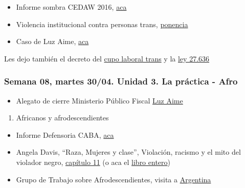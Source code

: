 \documentclass[
]{article}
\providecommand{\tightlist}{%
  \setlength{\itemsep}{0pt}\setlength{\parskip}{0pt}}
\begin{document}
\begin{itemize}
\item
  Informe sombra CEDAW 2016,
  \href{https://drive.google.com/file/d/1Zv0TtTTzgt5N4vSBEo3F7UjiayBQ2BIx/view?usp=sharing}{aca}
\item
  Violencia institucional contra personas trans,
  \href{https://drive.google.com/file/d/1NWDuVTHVpSSWbHTuvP6WPAy6waXvDyXo/view}{ponencia}
\item
  Caso de Luz Aime,
  \href{http://cosecharoja.org/absolvieron-a-luz-aime/}{aca}
\end{itemize}

Les dejo también el decreto del
\href{http://servicios.infoleg.gob.ar/infolegInternet/anexos/340000-344999/341808/norma.htm}{cupo
laboral trans} y la
\href{http://servicios.infoleg.gob.ar/infolegInternet/anexos/350000-354999/351815/norma.htm}{ley
27.636}

\hypertarget{semana-08-martes-3004.-unidad-3.-la-pruxe1ctica---afro}{%
\subsubsection{Semana 08, martes 30/04. Unidad 3. La práctica -
Afro}\label{semana-08-martes-3004.-unidad-3.-la-pruxe1ctica---afro}}

\begin{itemize}
\tightlist
\item
  Alegato de cierre Ministerio Público Fiscal
  \href{https://youtu.be/ZKH82JYVLgc}{Luz Aime}
\end{itemize}

\begin{enumerate}
\def\labelenumi{\alph{enumi}.}
\setcounter{enumi}{4}
\tightlist
\item
  Africanos y afrodescendientes
\end{enumerate}

\begin{itemize}
\item
  Informe Defensoria CABA,
  \href{https://drive.google.com/file/d/1vIoZ7GBl8fwXbZWhqoCxqOHsHMvP7Dki/view?usp=sharing}{aca}
\item
  Angela Davis, ``Raza, Mujeres y clase'', Violación, racismo y el mito
  del violador negro,
  \href{https://drive.google.com/file/d/1ghSHi12WUBBQlkcBQYiA5--Z_rGMnndc/view?usp=sharing}{capítulo
  11} (o aca el
  \href{https://drive.google.com/file/d/1dKW89DDQlKGgsKIE74Mi7i6pnmdTvDxn/view?usp=sharing}{libro
  entero})
\item
  Grupo de Trabajo sobre Afrodescendientes, visita a
  \href{http://daccess-ods.un.org/access.nsf/Get?Open\&DS=A/HRC/42/59/Add.2\&Lang=S}{Argentina}
\end{itemize}
\end{document}
